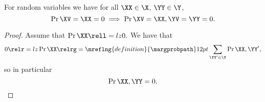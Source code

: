 \begin{proposition}
  For random variables 
  we have for all $\XX \in \X$, $\YY \in \Y$,
  $$\Pr{\XV = \XX}  = 0 \implies \Pr{\XV = \XX, \YV = \YY} = 0.$$%
\end{proposition}

\begin{proof}
  Assume that $\Pr{\XX} \rell = lz 0.$
  We have that
  $$0 \relr = lz \Pr{\XX} \relrg = \mreflng{definition}{\margprobpath} 12pt \sum_{\YY' \in \Y}\Pr{\XX, \YY'},$$
  so in particular
  $$\Pr{\XX, \YY} = 0.$$%
\end{proof}
